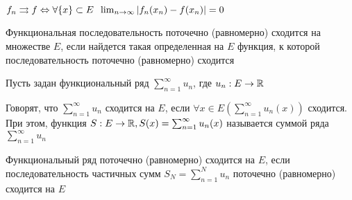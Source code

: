 \begin{problem}
  \(f_n \rightrightarrows f \Leftrightarrow \forall \{x\} \subset E\;\; \lim_{n \rightarrow \infty} |f_n(x_n) - f(x_n)| = 0\)
\end{problem}

\begin{definition}
  Функциональная последовательность поточечно (равномерно) сходится на множестве \(E\), если найдется такая определенная на \(E\) функция, к которой последовательность поточечно (равномерно) сходится
\end{definition}

Пусть задан функциональный ряд \(\sum_{n = 1}^\infty u_n\), где \(u_n: E \rightarrow \mathbb{R}\)
\begin{definition}
  Говорят, что \(\sum_{n = 1}^\infty u_n\) сходится на \(E\), если \(\forall x \in E \left(\sum_{n = 1}^\infty u_n(x)\right)\) сходится. При этом, функция \(S: E \rightarrow \mathbb{R}, S(x) = \sum_{n = 1}^\infty u_n(x)\) называется суммой ряда \(\sum_{n = 1}^\infty u_n\)
\end{definition}

\begin{definition}
  Функциональный ряд поточечно (равномерно) сходится на \(E\), если последовательность частичных сумм \(S_N = \sum_{n = 1}^N u_n\) поточечно (равномерно) сходится на \(E\)
\end{definition}

